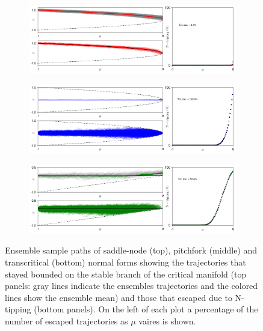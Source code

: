 \documentclass[../main.tex]{subfiles}
\begin{document}
\begin{figure}[H]
    \centering 
    \begin{subfigure}[b]{0.95\textwidth}
        \centering 
        \includegraphics[keepaspectratio, width = \linewidth]{../figures/fig3.6.1.png}
        \label{fig3.6.1}
    \end{subfigure}
    \hfill 
    \begin{subfigure}[b]{0.95\textwidth}
        \centering 
        \includegraphics[keepaspectratio, width = \linewidth]{../figures/fig3.6.2.png}
        \label{fig3.6.2}
    \end{subfigure}
    \hfill
    \begin{subfigure}[b]{0.95\textwidth}
        \centering 
        \includegraphics[keepaspectratio, width = \linewidth]{../figures/fig3.6.3.png}
        \label{fig3.6.3}
    \end{subfigure}
    \caption{Ensemble sample paths of saddle-node (top), pitchfork (middle) and transcritical (bottom) normal forms showing the trajectories that stayed bounded on the stable branch of the critical manifold (top panels: gray lines indicate the ensembles trajectories and the colored lines show the ensemble mean) and those that escaped due to N-tipping (bottom panels). 
    On the left of each plot a percentage of the number of escaped trajectories as $\mu$ vaires is shown.}
    \label{fig3.6}
\end{figure}
\end{document}

